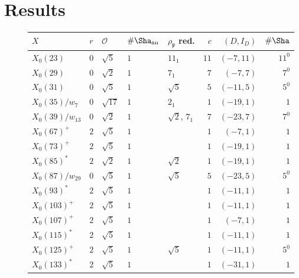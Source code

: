 \documentclass{amsart}
\newcommand{\pfr}{{\mathfrak{p}}}
\newcommand{\Ocal}{{\mathcal{O}}}
\newcommand{\an}{{\mathrm{an}}}
\begin{document}
	\section{Results}
	
	\begin{figure}[tbp]
		\begin{tabular}{lllllrrr}
			\toprule
			$X$ & $r$ & $\Ocal$ & $\#\Sha_\an$ & $\rho_\pfr$ red. & $c$ & $(D,I_D)$ &  $\#\Sha$ \\
			\midrule
			$X_0(23)$        & $0$ & $\sqrt{5}$  & $1$   & $11_1$           & $11$ & $(-7, 11)$  & $11^{0}$ \\
			$X_0(29)$        & $0$ & $\sqrt{2}$  & $1$   & $7_1$             & $7$ & $(-7,  7)$  & $7^{0}$  \\
			$X_0(31)$        & $0$ & $\sqrt{5}$  & $1$   & $\sqrt{5}$        & $5$ & $(-11, 5)$  & $5^0$  \\
			$X_0(35)/w_7$    & $0$ & $\sqrt{17}$ & $1$   & $2_1$             & $1$ & $(-19, 1)$  & $1$    \\
			$X_0(39)/w_{13}$ & $0$ & $\sqrt{2}$  & $1$   & $\sqrt{2}$, $7_1$ & $7$ & $(-23, 7)$  & $7^{0}$  \\
			$X_0(67)^+$      & $2$ & $\sqrt{5}$  & $1$   &                   & $1$ & $(-7,  1)$  & $1$    \\
			$X_0(73)^+$      & $2$ & $\sqrt{5}$  & $1$   &                   & $1$ & $(-19, 1)$  & $1$    \\
			$X_0(85)^*$      & $2$ & $\sqrt{2}$  & $1$   & $\sqrt{2}$        & $1$ & $(-19, 1)$  & $1$    \\
			$X_0(87)/w_{29}$ & $0$ & $\sqrt{5}$  & $1$   & $\sqrt{5}$        & $5$ & $(-23, 5)$  & $5^0$  \\
			$X_0(93)^*$      & $2$ & $\sqrt{5}$  & $1$   &                   & $1$ & $(-11, 1)$  & $1$    \\
			$X_0(103)^+$     & $2$ & $\sqrt{5}$  & $1$   &                   & $1$ & $(-11, 1)$  & $1$    \\
			$X_0(107)^+$     & $2$ & $\sqrt{5}$  & $1$   &                   & $1$ & $(-7,  1)$  & $1$    \\
			$X_0(115)^*$     & $2$ & $\sqrt{5}$  & $1$   &                   & $1$ & $(-11, 1)$  & $1$    \\
			$X_0(125)^+$     & $2$ & $\sqrt{5}$  & $1$   & $\sqrt{5}$        & $1$ & $(-11, 1)$  & $5^0$  \\
			$X_0(133)^*$     & $2$ & $\sqrt{5}$  & $1$   &                   & $1$ & $(-31, 1)$  & $1$    \\

\end{tabular}
\end{figure}
\end{document}
